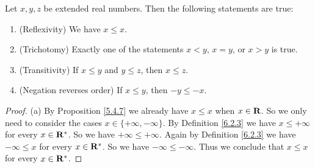 \setcounter{theorem}{4}
\begin{proposition}\label{6.2.5}
    Let \(x, y, z\) be extended real numbers.
    Then the following statements are true:
    \begin{enumerate}
        \item (Reflexivity)
              We have \(x \leq x\).
        \item (Trichotomy)
              Exactly one of the statements \(x < y\), \(x = y\), or \(x > y\) is true.
        \item (Transitivity)
              If \(x \leq y\) and \(y \leq z\), then \(x \leq z\).
        \item (Negation reverses order) If \(x \leq y\), then \(-y \leq -x\).
    \end{enumerate}
\end{proposition}

\begin{proof}{(a)}
    By Proposition \ref{5.4.7} we already have \(x \leq x\) when \(x \in \mathbf{R}\).
    So we only need to consider the cases \(x \in \{+\infty, -\infty\}\).
    By Definition \ref{6.2.3} we have \(x \leq +\infty\) for every \(x \in \mathbf{R}^*\).
    So we have \(+\infty \leq +\infty\).
    Again by Definition \ref{6.2.3} we have \(-\infty \leq x\) for every \(x \in \mathbf{R}^*\).
    So we have \(-\infty \leq -\infty\).
    Thus we conclude that \(x \leq x\) for every \(x \in \mathbf{R}^*\).
\end{proof}

